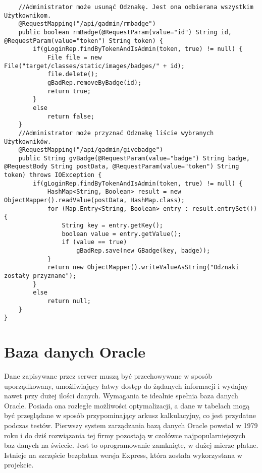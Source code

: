\documentclass[a4paper,12pt,twoside,openany]{report}
\begin{document}
\begin{lstlisting}
    //Administrator może usunąć Odznakę. Jest ona odbierana wszystkim Użytkownikom.
    @RequestMapping("/api/gadmin/rmbadge")
    public boolean rmBadge(@RequestParam(value="id") String id, @RequestParam(value="token") String token) {
        if(gLoginRep.findByTokenAndIsAdmin(token, true) != null) {
            File file = new File("target/classes/static/images/badges/" + id);
            file.delete();
            gBadRep.removeByBadge(id);
            return true;
        }
        else
            return false;
    }
    //Administrator może przyznać Odznakę liście wybranych Użytkowników.
    @RequestMapping("/api/gadmin/givebadge")
    public String gvBadge(@RequestParam(value="badge") String badge, @RequestBody String postData, @RequestParam(value="token") String token) throws IOException {
        if(gLoginRep.findByTokenAndIsAdmin(token, true) != null) {
            HashMap<String, Boolean> result = new ObjectMapper().readValue(postData, HashMap.class);
            for (Map.Entry<String, Boolean> entry : result.entrySet()) {
                String key = entry.getKey();
                boolean value = entry.getValue();
                if (value == true)
                    gBadRep.save(new GBadge(key, badge));
            }
            return new ObjectMapper().writeValueAsString("Odznaki zostały przyznane");
        }
        else
            return null;
    }
}

\end{lstlisting}
\chapter{Baza danych Oracle}
Dane zapisywane przez serwer muszą być przechowywane w sposób uporządkowany, umożliwiający łatwy dostęp do żądanych informacji i wydajny nawet przy dużej ilości danych. Wymagania te idealnie spełnia baza danych Oracle. Posiada ona rozległe możliwości optymalizacji, a dane w tabelach mogą być przeglądane w sposób przypominający arkusz kalkulacyjny,  co jest przydatne podczas testów.
Pierwszy system zarządzania bazą danych Oracle powstał w 1979 roku i do dziś rozwiązania tej firmy pozostają w czołówce najpopularniejszych baz danych na świecie. Jest to oprogramowanie zamknięte, w dużej mierze płatne. Istnieje na szczęście bezpłatna wersja Express, która została wykorzystana w projekcie.
\end{document}
